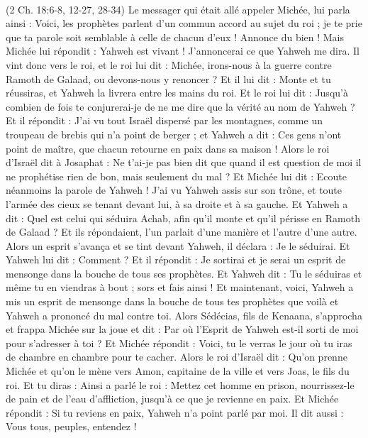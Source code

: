 \begin{multicols}{2}
{\\(2 Ch. 18:6-8, 12-27, 28-34)}
Le messager qui était allé appeler Michée, lui parla ainsi : Voici, les prophètes parlent d'un commun accord au sujet du roi ; je te prie que ta parole soit semblable à celle de chacun d’eux ! Annonce du bien !
Mais Michée lui répondit : Yahweh est vivant ! J’annoncerai ce que Yahweh me dira.
Il vint donc vers le roi, et le roi lui dit : Michée, irons-nous à la guerre contre Ramoth de Galaad, ou devons-nous y renoncer ? Et il lui dit : Monte et tu réussiras, et Yahweh la livrera entre les mains du roi.
Et le roi lui dit : Jusqu'à combien de fois te conjurerai-je de ne me dire que la vérité au nom de Yahweh ?
Et il répondit : J'ai vu tout Israël dispersé par les montagnes, comme un troupeau de brebis qui n'a point de berger ; et Yahweh a dit : Ces gens n’ont point de maître, que chacun retourne en paix dans sa maison !
Alors le roi d'Israël dit à Josaphat : Ne t'ai-je pas bien dit que quand il est question de moi il ne prophétise rien de bon, mais seulement du mal ?
Et Michée lui dit : Ecoute néanmoins la parole de Yahweh ! J'ai vu Yahweh assis sur son trône, et toute l'armée des cieux se tenant devant lui, à sa droite et à sa gauche.
Et Yahweh a dit : Quel est celui qui séduira Achab, afin qu'il monte et qu'il périsse en Ramoth de Galaad ? Et ils répondaient, l'un parlait d'une manière et l'autre d'une autre.
Alors un esprit s'avança et se tint devant Yahweh, il déclara : Je le séduirai. Et Yahweh lui dit : Comment ?
Et il répondit : Je sortirai et je serai un esprit de mensonge dans la bouche de tous ses prophètes. Et Yahweh dit : Tu le séduiras et même tu en viendras à bout ; sors et fais ainsi !
Et maintenant, voici, Yahweh a mis un esprit de mensonge dans la bouche de tous tes prophètes que voilà et Yahweh a prononcé du mal contre toi.
Alors Sédécias, fils de Kenaana, s'approcha et frappa Michée sur la joue et dit : Par où l'Esprit de Yahweh est-il sorti de moi pour s'adresser à toi ?
Et Michée répondit : Voici, tu le verras le jour où tu iras de chambre en chambre pour te cacher.
Alors le roi d'Israël dit : Qu'on prenne Michée et qu'on le mène vers Amon, capitaine de la ville et vers Joas, le fils du roi.
Et tu diras : Ainsi a parlé le roi : Mettez cet homme en prison, nourrissez-le de pain et de l’eau d’affliction, jusqu'à ce que je revienne en paix.
Et Michée répondit : Si tu reviens en paix, Yahweh n'a point parlé par moi. Il dit aussi : Vous tous, peuples, entendez !

\end{multicols}
